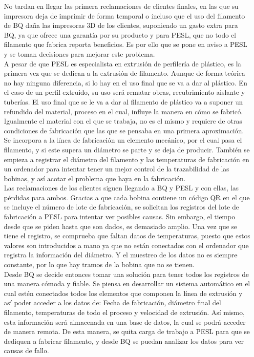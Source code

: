 No tardan en llegar las primera reclamaciones de clientes finales, en las que su impresora deja de imprimir de forma temporal o incluso que el uso del filamento de BQ daña las impresoras 3D de los clientes, suponiendo un gasto extra para BQ, ya que ofrece una garantía por su producto y para PESL, que no todo el filamento que fabrica reporta beneficios. Es por ello que se pone en aviso a PESL y se toman decisiones para mejorar este problema.\\

A pesar de que PESL es especialista en extrusión de perfilería de plástico, es la primera vez que se dedican a la extrusión de filamento. Aunque de forma teórica no hay ninguna diferencia, si lo hay en el uso final que se va a dar al plástico. En el caso de un perfil extruido, su uso será rematar obras, recubrimiento aislante y tuberías. El uso final que se le va a dar al filamento de plástico va a suponer un refundido del material, proceso en el cual, influye la manera en cómo se fabricó. Igualmente el material con el que se trabaja, no es el mismo y requiere de otras condiciones de fabricación que las que se pensaba en una primera aproximación.\\ 

Se incorpora a la línea de fabricación un elemento mecánico, por el cual pasa el filamento, y si este supera un diámetro se parte y se deja de producir. También se empieza a registrar el diámetro del filamento y las temperaturas de fabricación en un ordenador para intentar tener un mejor control de la trazabilidad de las bobinas, y así acotar el problema que haya en la fabricación.\\

Las reclamaciones de los clientes siguen llegando a BQ y PESL y con ellas, las pérdidas para ambos. Gracias a que cada bobina contiene un código QR en el que se incluye el número de lote de fabricación, se solicitan los registros del lote de fabricación a PESL para intentar ver posibles causas. Sin embargo, el tiempo desde que se piden hasta que son dados, es demasiado amplio. Una vez que se tiene el registro, se comprueba que faltan datos de temperaturas, puesto que estos valores son introducidos a mano ya que no están conectados con el ordenador que registra la información del diámetro. Y el muestreo de los datos no es siempre constante, por lo que hay tramos de la bobina que no se tienen.\\

Desde BQ se decide entonces tomar una solución para tener todos los registros de una manera cómoda y fiable. Se piensa en desarrollar un sistema automático en el cual estén conectados todos los elementos que componen la línea de extrusión y así poder acceder a los datos de: Fecha de fabricación, diámetro final del filamento, temperaturas de todo el proceso y velocidad de extrusión. Así mismo, esta información será almacenada en una base de datos, la cual se podrá acceder de manera remota. De esta manera, se quita carga de trabajo a PESL para que se dediquen a fabricar filamento, y desde BQ se puedan analizar los datos para ver causas de fallo.\\

